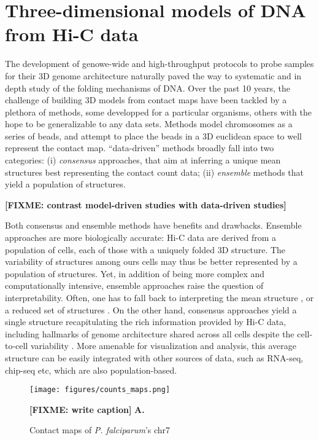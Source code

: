 \documentclass[letterpaper,12pt]{article}
\newcommand{\fixme}[1]{\textbf{[FIXME: #1]}}
\begin{document}
\section*{Three-dimensional models of DNA from Hi-C data}

The development of genowe-wide and high-throughput protocols to probe samples
for their 3D genome architecture naturally paved the way to systematic and in
depth study of the folding mechanisms of DNA. Over the past 10 years, the
challenge of building 3D models from contact maps have been tackled by a
plethora of methods, some developped for a particular organisms, others with
the hope to be generalizable to any data sets. Methods model chromosomes as a
series of beads, and attempt to place the beads in a 3D euclidean space to
well represent the contact map. ``data-driven'' methods broadly fall into two
categories: (i) \textit{consensus} approaches, that aim at inferring a unique
mean structures best representing the contact count data; (ii)
\textit{ensemble} methods that yield a population of structures.

\fixme{contrast model-driven studies with data-driven studies}

Both consensus and ensemble methods have benefits and drawbacks. Ensemble
approaches are more biologically accurate: Hi-C data are derived from a
population of cells, each of those with a uniquely folded 3D structure. The
variability of structures among ours cells may thus be better represented by a
population of structures. Yet, in addition of being more complex and
computationally intensive, ensemble approaches raise the question of
interpretability. Often, one has to fall back to interpreting the mean
structure \citep{kalhor:genome}, or a reduced set of structures
\citep{rousseau:three}. On the other hand, consensus approaches yield a single
structure recapitulating the rich information provided by Hi-C data, including
hallmarks of genome architecture shared across all cells despite the
cell-to-cell variability \citet{nagano:single-cell}. More amenable for
visualization and analysis, this average structure can be easily integrated
with other sources of data, such as RNA-seq, chip-seq etc, which are also
population-based.


\begin{figure}
\centering
\texttt{[image: figures/counts\_maps.png]}
\caption{Contact maps of {\em P. falciparum}'s chr7}{
\fixme{write caption}
\textbf{A.} \citep{lemieux:genome-wide}}
\label{Fig1}
\end{figure}
\end{document}
